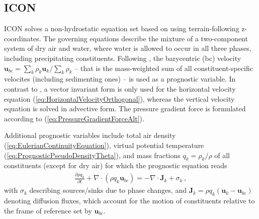 \documentclass[gmd, manuscript]{copernicus}
\newcommand{\vb}{\mathbf}
\begin{document}


\subsection{ICON} \label{sec:ICONEquations}

ICON solves a non-hydrostatic equation set based on \cite{gassmann2008} 
using terrain-following z-coordinates. The governing equations describe the mixture 
of a two-component system of dry air and water, where water is allowed to occur in 
all three phases, including precipitating constituents. Following \cite{wacker2006}, 
the barycentric (bc) velocity $\vb{u}_{bc}=\sum_{k} \rho_{k} \vb{u}_{k}/\sum_{k}\rho_{k}$ -- 
that is the mass-weighted sum of all constituent-specific velocites (including sedimenting ones) --
is used as a prognostic variable. In contrast to \cite{gassmann2008}, 
a vector invariant form is only used for the horizontal velocity equation 
(\ref{eq:HorizontalVelocityOrthogonal}), whereas the vertical velocity equation is solved in advective form. 
The pressure gradient force is formulated according to (\ref{eq:PressureGradientForceAlt}).


Additional prognostic variables include total air density (\ref{eq:EulerianContinuityEquation}), virtual potential temperature (\ref{eq:PrognosticPseudoDensityTheta}), 
and mass fractions $q_{k}=\rho_{k}/\rho$ of all constituents (except for dry air) for which the 
prognostic equation reads
\begin{align}
\frac{\partial \rho q_{k}}{\partial t} + \nabla\cdot\left(\rho q_{k} \vb{u}_{bc}\right) = 
-\nabla\cdot \vb{J}_{k}  + \sigma_{k}\,,
\end{align}
with $\sigma_{k}$ describing sources/sinks due to phase changes, and  
$\vb{J}_{k}=\rho q_{k}\left(\vb{u}_{k} - \vb{u}_{bc}\right)$ denoting diffusion fluxes, 
which account for the motion of constituents relative to the frame of reference set by $\vb{u}_{bc}$.
\end{document}
